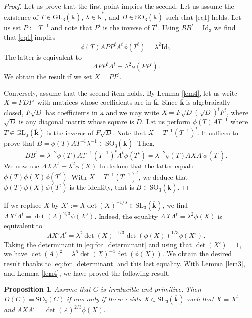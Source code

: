 \documentclass[a4paper,11pt]{amsart}
\newtheorem{prop}[thm]{Proposition}
\def\k{\mathbf{k}}
\begin{document}
\begin{proof}
Let us prove that the first point implies the second.  
Let us assume the existence of  $T\in \mathrm{GL}_3(\overline{\mathbf{k}})$,  $\lambda \in \mathbf{\overline{\mathbf{k}}}^*$,  and $B\in  \mathrm{SO}_3(\overline{\k})$ such that \eqref{eq1} holds. Let us set $P:=T^{-1}$ and note that $P^t$ is the inverse of $T^t$.  Using $BB^t=\mathrm{Id}_3$ we find that \eqref{eq1} implies
 $$\phi(T)APP^t A^t \phi(T^t)=\lambda^2 \mathrm{Id}_3.$$
The latter is equivalent to 
 $$APP^t A^t =\lambda^2\phi(PP^t).$$
 We obtain the result if we set $X=PP^t$. \par 
 Conversely,  assume that the second item holds.  By Lemma \ref{lem4},  let us write $X=FDF^t$ with matrices whose coefficients are in $\overline{\mathbf{k}}$. Since $\overline{\mathbf{k}}$ is algebraically closed,  $F\sqrt{D}$ has coefficients in $\overline{\mathbf{k}}$ and we may write 
 $X=F\sqrt{D}(\sqrt{D})^t F^t$, where $\sqrt{D}$ is any diagonal matrix whose square is $D$.  Let us perform $\phi(T)AT^{-1}$ where $T\in \mathrm{GL}_3(\overline{\mathbf{k}})$ is the inverse of $F\sqrt{D}$.  Note that $X=T^{-1}(T^{-1})^t $.  It suffices to prove that $B=\phi(T)AT^{-1}\lambda^{-1}\in \mathrm{SO}_3(\overline{\mathbf{k}})$. 
 Then, 
 $$B B^t=\lambda^{-2} \phi(T)AT^{-1}(T^{-1})^t A^{t}\phi(T^t)=\lambda^{-2} \phi(T)AX A^{t}\phi(T^t).$$
 We now use $A XA^t =\lambda^{2}\phi(X)$ to deduce that the latter equals 
 $ \phi(T)\phi(X) \phi(T^t). $
With $X=T^{-1}(T^{-1})^t $, we deduce that  $\phi(T)\phi(X) \phi(T^t)$ is the identity, that is $B\in  \mathrm{SO}_3(\overline{\mathbf{k}})$. 
\end{proof}

If we replace $X$ by $X':=X\det(X)^{-1/3}\in \mathrm{SL}_3 (\overline{\mathbf{k}})$,  we find $A X'A^t =\det(A)^{2/3}\phi(X')$. Indeed, the equality $AXA^t=\lambda^2 \phi(X)$ is equivalent to 
\begin{equation}
\label{eq:for_determinant}
AX'A^t = \lambda^2\det(X)^{-1/3}\det(\phi(X))^{1/3} \phi(X')\, .
\end{equation}
Taking the determinant in \eqref{eq:for_determinant} and using that $\det(X')=1$, we have $\det(A)^2=\lambda^6\det(X)^{-1}\det(\phi(X))$. We obtain the desired result thanks to 
 \eqref{eq:for_determinant} and this last equality.
With Lemma \ref{lem3},  and Lemma \ref{lem4},  we have proved the following result.
 
\begin{prop}\label{prop3}
Assume that $G$ is irreducible and primitive.   Then,  $D(G)=\mathrm{SO}_3(C)$ if and only if there exists $X\in \mathrm{SL}_3(\overline{\mathbf{k}})$ such that $X=X^t$ and  $A XA^t =\det(A)^{2/3}\phi(X)$.
\end{prop}
\end{document}
